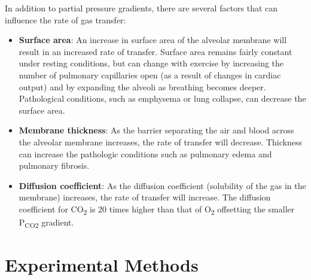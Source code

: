 \documentclass{article}
\begin{document}
In addition to partial pressure gradients, there are several factors that can influence the rate of gas transfer:
\begin{itemize}
	\item \textbf{Surface area}: An increase in surface area of the alveolar membrane will result in an increased rate of transfer. Surface area remains fairly constant under resting conditions, but can change with exercise by increasing the number of pulmonary capillaries open (as a result of changes in cardiac output) and by expanding the alveoli as breathing becomes deeper. Pathological conditions, such as emphysema or lung collapse, can decrease the surface area.
	\item \textbf{Membrane thickness}: As the barrier separating the air and blood across the alveolar membrane increases, the rate of transfer will decrease. Thickness can increase the pathologic conditions such as pulmonary edema and pulmonary fibrosis.
	\item \textbf{Diffusion coefficient}: As the diffusion coefficient (solubility of the gas in the membrane) increases, the rate of transfer will increase. The diffusion coefficient for CO\textsubscript{2} is 20 times higher than that of O\textsubscript{2} offsetting the smaller P\textsubscript{CO2} gradient.
\end{itemize}

\section*{Experimental Methods}
\end{document}
